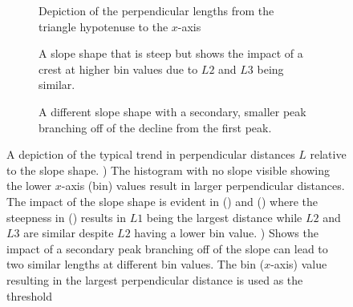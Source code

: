 \begin{figure}
\centering
\begin{subfigure}[t]{0.3\textwidth}
    \centering
    \resizebox{!}{4.4cm}{
    
    }
    \caption{Depiction of the perpendicular lengths from the triangle hypotenuse to the $x$-axis}
    \label{subfig:triangleA}
\end{subfigure}
\hfill
\begin{subfigure}[t]{0.3\textwidth}
    \centering
    \resizebox{!}{4.4cm}{
    
    }
    \caption{A slope shape that is steep but shows the impact of a crest at higher bin values due to $L2$ and $L3$ being similar.}
    \label{subfig:triangleB}
\end{subfigure}
\hfill
\begin{subfigure}[t]{0.3\textwidth}
    \centering
    \resizebox{!}{4.4cm}{
    
    }
    \caption{A different slope shape with a secondary, smaller peak branching off of the decline from the first peak.}
    \label{subfig:triangleC}
\end{subfigure}
\caption[A depiction of the typical trend in perpendicular distances $L$ relative to the slope shape]{A depiction of the typical trend in perpendicular distances $L$ relative to the slope shape. ) The histogram with no slope visible showing the lower $x$-axis (bin) values result in larger perpendicular distances. The impact of the slope shape is evident in () and () where the steepness in () results in $L1$ being the largest distance while $L2$ and $L3$ are similar despite $L2$ having a lower bin value. ) Shows the impact of a secondary peak branching off of the slope can lead to two similar lengths at different bin values. The bin ($x$-axis) value resulting in the largest perpendicular distance is used as the threshold}
\label{fig:triangles}
\end{figure}

